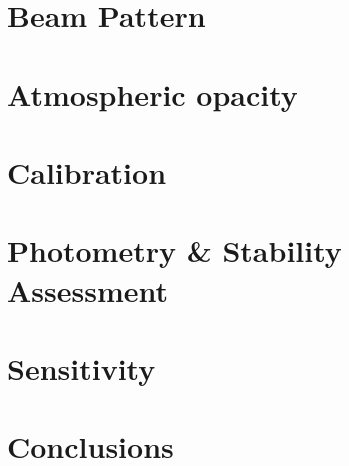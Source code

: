 \documentclass{aa}
\begin{document}
\section{Beam Pattern}
\label{se:beam}


\section{Atmospheric opacity}
\label{se:opacity}


\section{Calibration}
\label{se:calibration}



\section{Photometry \& Stability Assessment}
\label{se:photometry}
%

\section{Sensitivity}
\label{se:sensitivity}
%


\section{Conclusions}
\end{document}
